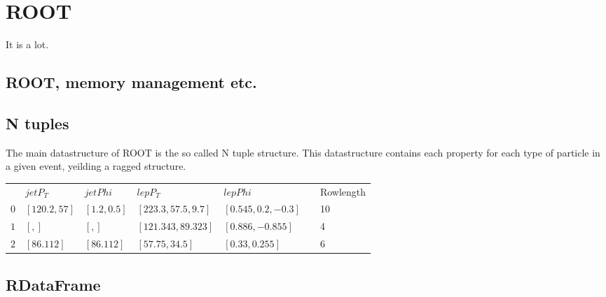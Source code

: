\section{ROOT}

It is a lot. \cite{ROOT}
\subsection*{ROOT, memory management etc.}


\subsection*{N tuples}

The main datastructure of ROOT is the so called N tuple structure. This datastructure contains each property for each type of particle in a given event, yeilding
a ragged structure. 

\begin{table}[h!]
    \begin{tabular}{|l|l|l|l|l|l|l|}
    \cline{1-5} \cline{7-7}
        & $jetP_T$      & $jetPhi$     & $lepP_T$             & $lepPhi$             &  & Rowlength \\ \cline{1-5} \cline{7-7} 
    $0$ & $[120.2, 57]$ & $[1.2, 0.5]$ & $[223.3, 57.5, 9.7]$ & $[0.545, 0.2, -0.3]$ &  & 10        \\ \cline{1-5} \cline{7-7} 
    $1$ & $[, ]$          & $[, ]$         & $[121.343, 89.323]$  & $[0.886, -0.855]$    &  & 4         \\ \cline{1-5} \cline{7-7} 
    $2$ & $[86.112]$    & $[86.112]$   & $[57.75, 34.5]$      & $[0.33, 0.255]$      &  & 6         \\ \cline{1-5} \cline{7-7} 
    \end{tabular}
\end{table}

\subsection*{RDataFrame}

\cite{Manca:2694107}

